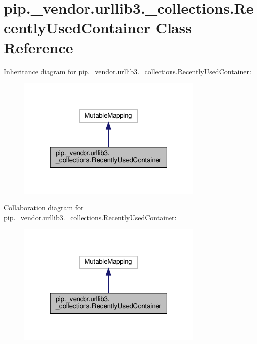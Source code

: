 \hypertarget{classpip_1_1__vendor_1_1urllib3_1_1__collections_1_1RecentlyUsedContainer}{}\section{pip.\+\_\+vendor.\+urllib3.\+\_\+collections.\+Recently\+Used\+Container Class Reference}
\label{classpip_1_1__vendor_1_1urllib3_1_1__collections_1_1RecentlyUsedContainer}


Inheritance diagram for pip.\+\_\+vendor.\+urllib3.\+\_\+collections.\+Recently\+Used\+Container\+:
\nopagebreak
\begin{figure}[H]
\begin{center}
\leavevmode
\includegraphics[width=256pt]{classpip_1_1__vendor_1_1urllib3_1_1__collections_1_1RecentlyUsedContainer__inherit__graph}
\end{center}
\end{figure}


Collaboration diagram for pip.\+\_\+vendor.\+urllib3.\+\_\+collections.\+Recently\+Used\+Container\+:
\nopagebreak
\begin{figure}[H]
\begin{center}
\leavevmode
\includegraphics[width=256pt]{classpip_1_1__vendor_1_1urllib3_1_1__collections_1_1RecentlyUsedContainer__coll__graph}
\end{center}
\end{figure}
